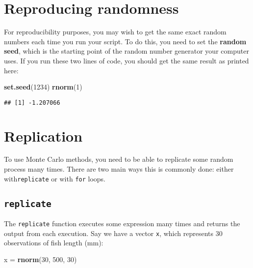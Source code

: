 \documentclass[]{book}
\newenvironment{Shaded}{\begin{snugshade}}{\end{snugshade}}
\newcommand{\KeywordTok}[1]{\textcolor[rgb]{0.13,0.29,0.53}{\textbf{#1}}}
\newcommand{\DecValTok}[1]{\textcolor[rgb]{0.00,0.00,0.81}{#1}}
\newcommand{\StringTok}[1]{\textcolor[rgb]{0.31,0.60,0.02}{#1}}
\newcommand{\NormalTok}[1]{#1}
\theoremstyle{definition}
\theoremstyle{definition}
\theoremstyle{definition}
\theoremstyle{remark}
\begin{document}
\section{Reproducing randomness}\label{reproducing-randomness}

For reproducibility purposes, you may wish to get the same exact random
numbers each time you run your script. To do this, you need to set the
\textbf{random seed}, which is the starting point of the random number
generator your computer uses. If you run these two lines of code, you
should get the same result as printed here:

\begin{Shaded}
\begin{Highlighting}[]
\KeywordTok{set.seed}\NormalTok{(}\DecValTok{1234}\NormalTok{)}
\KeywordTok{rnorm}\NormalTok{(}\DecValTok{1}\NormalTok{)}
\end{Highlighting}
\end{Shaded}

\begin{verbatim}
## [1] -1.207066
\end{verbatim}

\section{Replication}\label{replication}

To use Monte Carlo methods, you need to be able to replicate some random
process many times. There are two main ways this is commonly done:
either with\texttt{replicate} or with \texttt{for} loops.

\subsection{\texorpdfstring{\texttt{replicate}}{replicate}}\label{replicate}

The \texttt{replicate} function executes some expression many times and
returns the output from each execution. Say we have a vector \texttt{x},
which represents 30 observations of fish length (mm):

\begin{Shaded}
\begin{Highlighting}[]
\NormalTok{x =}\StringTok{ }\KeywordTok{rnorm}\NormalTok{(}\DecValTok{30}\NormalTok{, }\DecValTok{500}\NormalTok{, }\DecValTok{30}\NormalTok{)}
\end{Highlighting}
\end{Shaded}
\end{document}
